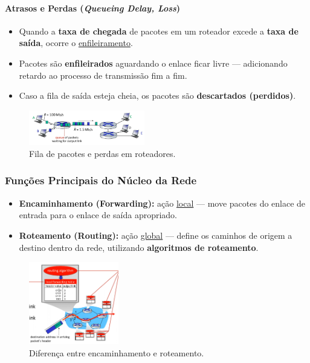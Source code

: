     \paragraph{Atrasos e Perdas (\textit{Queueing Delay, Loss})}
    \begin{itemize}[left=0.5cm, align=left, nosep]
        \item Quando a \textbf{taxa de chegada} de pacotes em um roteador excede a \textbf{taxa de saída}, ocorre o \underline{enfileiramento}.
        \item Pacotes são \textbf{enfileirados} aguardando o enlace ficar livre — adicionando retardo ao processo de transmissão fim a fim.
        \item Caso a fila de saída esteja cheia, os pacotes são \textbf{descartados (perdidos)}.
    \end{itemize}

    \begin{figure}[H]
        \centering
        \includegraphics[width=0.45\textwidth]{img/cap-01/fila-e-perda.png}
        \caption{Fila de pacotes e perdas em roteadores.}
    \end{figure}

    \subsubsection*{Funções Principais do Núcleo da Rede}
    \begin{itemize}[left=0.5cm, align=left, nosep]
        \item \textbf{Encaminhamento (Forwarding):} ação \underline{local} — move pacotes do enlace de entrada para o enlace de saída apropriado.
        \item \textbf{Roteamento (Routing):} ação \underline{global} — define os caminhos de origem a destino dentro da rede, utilizando \textbf{algoritmos de roteamento}.
    \end{itemize}

    \begin{figure}[H]
        \centering
        \includegraphics[width=0.35\textwidth]{img/cap-01/encaminhamento-roteamento.png}
        \caption{Diferença entre encaminhamento e roteamento.}
    \end{figure}

